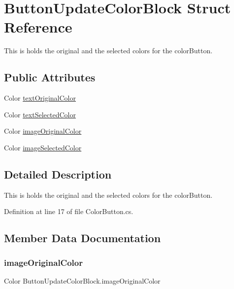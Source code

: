 \hypertarget{struct_button_update_color_block}{}\section{Button\+Update\+Color\+Block Struct Reference}
\label{struct_button_update_color_block}


This is holds the original and the selected colors for the color\+Button.  


\subsection*{Public Attributes}
\begin{DoxyCompactItemize}
\item 
Color \hyperlink{struct_button_update_color_block_a4d1b4676724da62fd084257f2ba7fce8}{text\+Original\+Color}
\item 
Color \hyperlink{struct_button_update_color_block_a1f809394ca3fd7c6be0f7e983097d1b6}{text\+Selected\+Color}
\item 
Color \hyperlink{struct_button_update_color_block_a1c1619ec6a08857520f9026ba945b2b1}{image\+Original\+Color}
\item 
Color \hyperlink{struct_button_update_color_block_a1536976b251add90a184f428dd71db33}{image\+Selected\+Color}
\end{DoxyCompactItemize}


\subsection{Detailed Description}
This is holds the original and the selected colors for the color\+Button. 



Definition at line 17 of file Color\+Button.\+cs.



\subsection{Member Data Documentation}
\mbox{\label{struct_button_update_color_block_a1c1619ec6a08857520f9026ba945b2b1}} 
\subsubsection{\texorpdfstring{image\+Original\+Color}{imageOriginalColor}}
{\footnotesize\ttfamily Color Button\+Update\+Color\+Block.\+image\+Original\+Color}



